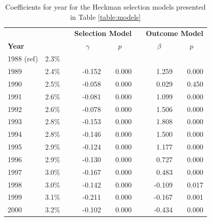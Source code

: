 \begin{table}[H]
	\renewcommand{\baselinestretch}{1.0} 
	\small
	\centering
	\caption{{Coefficients for year for the Heckman selection models presented in Table \ref{table:models}}}
	\label{table:models_2}
	\begin{tabular}{lrrrrrrr}
		\hline
		&         &  & \multicolumn{2}{r}{\textbf{Selection Model}}              &                      & \multicolumn{2}{r}{\textbf{Outcome Model}}                \\
		\textbf{Year}   &  &  & \multicolumn{1}{c}{$\gamma$} & \multicolumn{1}{c}{$p$} & \multicolumn{1}{c}{} & \multicolumn{1}{c}{$\beta$} & \multicolumn{1}{c}{$p$} \\ \hline
		
		1988 (ref) & 2.3\% &  &                   &                 &  &                  &                \\
		1989       & 2.4\% &  & -0.152            & 0.000           &  & 1.259            & 0.000          \\
		1990       & 2.5\% &  & -0.058            & 0.000           &  & 0.029            & 0.450          \\
		1991       & 2.6\% &  & -0.081            & 0.000           &  & 1.099            & 0.000          \\
		1992       & 2.6\% &  & -0.078            & 0.000           &  & 1.506            & 0.000          \\
		1993       & 2.8\% &  & -0.153            & 0.000           &  & 1.808            & 0.000          \\
		1994       & 2.8\% &  & -0.146            & 0.000           &  & 1.500            & 0.000          \\
		1995       & 2.9\% &  & -0.124            & 0.000           &  & 1.177            & 0.000          \\
		1996       & 2.9\% &  & -0.130            & 0.000           &  & 0.727            & 0.000          \\
		1997       & 3.0\% &  & -0.167            & 0.000           &  & 0.483            & 0.000          \\
		1998       & 3.0\% &  & -0.142            & 0.000           &  & -0.109           & 0.017          \\
		1999       & 3.1\% &  & -0.211            & 0.000           &  & -0.167           & 0.001          \\
		2000       & 3.2\% &  & -0.102            & 0.000           &  & -0.434           & 0.000          \\

\end{tabular}
\end{table}
